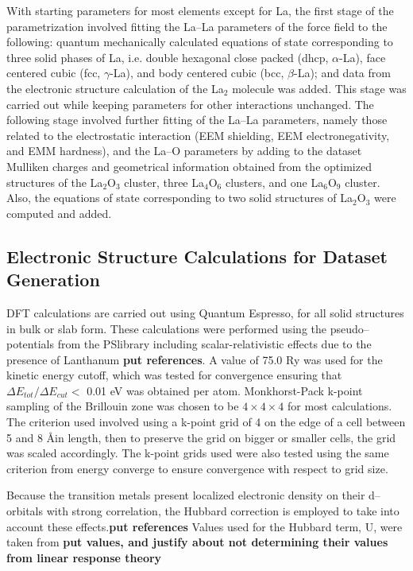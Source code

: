 \documentclass[journal=jpcafh,manuscript=article]{achemso}
\begin{document}
With starting parameters for most elements except for La, the first stage of the parametrization involved fitting the La--La parameters of the force field to the following: quantum mechanically calculated equations of state corresponding to three solid phases of La, i.e. double hexagonal close packed (dhcp, $\alpha$-La), face centered cubic (fcc, $\gamma$-La), and body centered cubic (bcc, $\beta$-La); and data from the electronic structure calculation of the La$_2$ molecule was added.
This stage was carried out while keeping parameters for other interactions unchanged.
The following stage involved further fitting of the La--La parameters, namely those related to the electrostatic interaction (EEM shielding, EEM electronegativity, and EMM hardness), and the La--O parameters by adding to the dataset Mulliken charges and geometrical information obtained from the optimized structures of the La$_2$O$_3$ cluster, three La$_4$O$_6$ clusters, and one La$_6$O$_9$ cluster.
Also, the equations of state corresponding to two solid structures of La$_2$O$_3$ were computed and added.


\subsection{Electronic Structure Calculations for Dataset Generation}
\label{sec:dft-details}

DFT calculations are carried out using Quantum Espresso,\cite{giannozzi_advanced_2017} for all solid structures in bulk or slab form.
These calculations were performed using the pseudo--potentials from the PSlibrary including scalar-relativistic effects due to the presence of Lanthanum \textbf{put references}.
A value of 75.0 Ry was used for the kinetic energy cutoff, which was tested for convergence ensuring that $\Delta E_{tot} / \Delta E_{cut} <$ 0.01 eV was obtained per atom.
Monkhorst-Pack k-point sampling of the Brillouin zone was chosen to be $4\times4\times4$ for most calculations.
The criterion used involved using a k-point grid of 4 on the edge of a cell between 5 and 8 \AA in length, then to preserve the grid on bigger or smaller cells, the grid was scaled accordingly.
The k-point grids used were also tested using the same criterion from energy converge to ensure convergence with respect to grid size.

Because the transition metals present localized electronic density on their d--orbitals with strong correlation, the Hubbard correction is employed to take into account these effects.\textbf{put references}
Values used for the Hubbard term, U, were taken from \textbf{put values, and justify about not determining their values from linear response theory}
\end{document}
